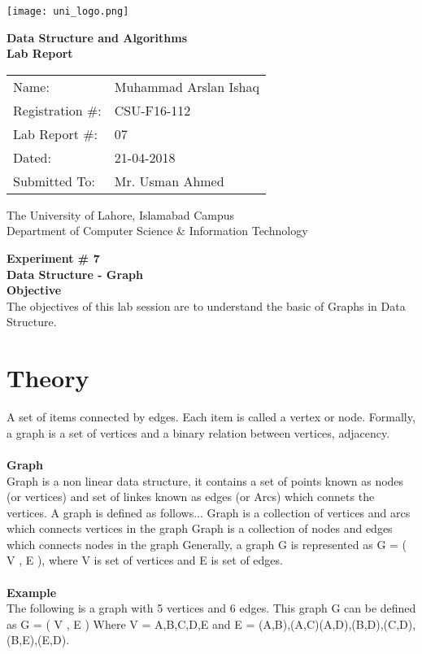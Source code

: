 \documentclass[11pt]{article}            %
\begin{document}
\begin{titlepage}
    \centering
  \vfill
    \texttt{[image: uni\_logo.png]} \\ 
	\vskip2cm
    {\bfseries\Large
	Data Structure and Algorithms \\ 
	
	\vskip2cm
	Lab Report 
	 
	\vskip2cm
	}    

\begin{center}
\begin{tabular}{ l l  } 

Name: & Muhammad Arslan Ishaq \\ 
Registration \#: & CSU-F16-112 \\ 
Lab Report \#: & 07 \\ 
 Dated:& 21-04-2018\\ 
Submitted To:& Mr. Usman Ahmed\\ 

\end{tabular}
\end{center}
    \vfill
    The University of Lahore, Islamabad Campus\\
Department of Computer Science \& Information Technology
\end{titlepage}


    
    {\bfseries\Large
\centering
	Experiment \# 7 \\

Data Structure - Graph \\
		}    
 \vskip1cm
 \textbf {Objective}\\  The objectives of this lab session are to understand the basic of Graphs in Data Structure.



\section{Theory }              
 A set of items connected by edges. Each item is called a vertex or node. Formally, a graph is a set of vertices and a binary relation between vertices, adjacency. \\  \\
\textbf{Graph}\\ 
Graph is a non linear data structure, it contains a set of points known as nodes (or vertices) and set of linkes known as edges (or Arcs) which connets the vertices. A graph is defined as follows...
Graph is a collection of vertices and arcs which connects vertices in the graph
Graph is a collection of nodes and edges which connects nodes in the graph
Generally, a graph G is represented as G = ( V , E ), where V is set of vertices and E is set of edges.
  \\ \\
\textbf{Example }\\
The following is a graph with 5 vertices and 6 edges.
This graph G can be defined as G = ( V , E )
Where V = {A,B,C,D,E} and E = {(A,B),(A,C)(A,D),(B,D),(C,D),(B,E),(E,D)}.
\end{document}
